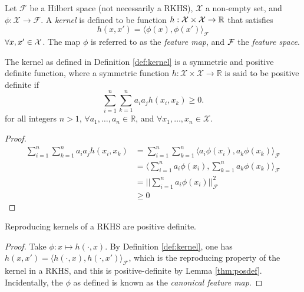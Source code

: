 \begin{definition}[Kernels]\label{def:kernel}
  Let $\mathcal F$ be a Hilbert space (not necessarily a RKHS), $\mathcal X$ a non-empty set, and $\phi:\mathcal X \rightarrow \mathcal F$.   
  A \emph{kernel} is defined to be function $h:{\mathcal X}\times{\mathcal X}\to\mathbb{R}$ that satisfies
  \[
    h(x,x') = \langle \phi(x), \phi(x') \rangle_{\mathcal F}
  \]
  $\forall x,x'\in{\mathcal X}$.
  The map $\phi$ is referred to as the \emph{feature map}, and ${\mathcal F}$ the \emph{feature space}.
\end{definition}

\begin{lemma}\label{thm:posdef}
  The kernel as defined in Definition \ref{def:kernel} is a symmetric and positive definite function, where a symmetric function $h:\mathcal X\times\mathcal X\rightarrow\mathbb R$ is said to be  positive definite if
  \[
    \sum_{i=1}^n\sum_{k=1}^n a_ia_jh(x_i, x_k) \geq 0.
  \]
  for all integers $n>1$, $\forall a_1, \dots, a_n \in \mathbb R$, and $\forall x_1, \dots, x_n \in \mathcal X$.
\end{lemma}

\begin{proof}
  \begin{align*}
    \sum_{i=1}^n\sum_{k=1}^n a_ia_jh(x_i, x_k)	
    &= \sum_{i=1}^n\sum_{k=1}^n \langle a_i\phi(x_i), a_k\phi(x_k) \rangle_{\mathcal F} \\
    &= \Bigg\langle \sum_{i=1}^n a_i\phi(x_i), \sum_{k=1}^n a_k\phi(x_k) \Bigg\rangle_{\mathcal F} \\
    &= \Bigg|\Bigg| \sum_{i=1}^n a_i\phi(x_i) \Bigg|\Bigg|_{\mathcal F}^2 \\
    & \geq 0
  \end{align*}
\end{proof}

\begin{corollary}
  Reproducing kernels of a RKHS are positive definite. 
\end{corollary}

\begin{proof}
  Take $\phi: x \mapsto h(\cdot,x)$. 
  By Definition \ref{def:kernel}, one has $h(x,x') = \langle h(\cdot, x), h(\cdot, x') \rangle_{\mathcal F}$, which is the reproducing property of the kernel in a RKHS, and this is positive-definite by Lemma \ref{thm:posdef}. 
  Incidentally, the $\phi$ as defined is known as the \emph{canonical feature map}.
\end{proof}

